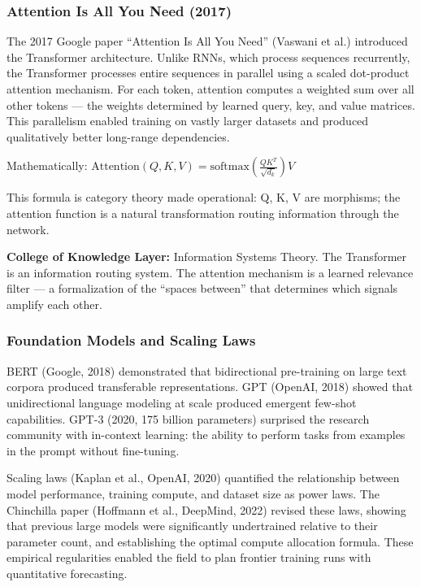 \documentclass[11pt,letterpaper]{article}
\begin{document}
\subsubsection{Attention Is All You Need (2017)}

The 2017 Google paper ``Attention Is All You Need'' (Vaswani et al.) introduced the Transformer architecture. Unlike RNNs, which process sequences recurrently, the Transformer processes entire sequences in parallel using a scaled dot-product attention mechanism. For each token, attention computes a weighted sum over all other tokens --- the weights determined by learned query, key, and value matrices. This parallelism enabled training on vastly larger datasets and produced qualitatively better long-range dependencies.

Mathematically: $\text{Attention}(Q,K,V) = \text{softmax}\left(\frac{QK^T}{\sqrt{d_k}}\right)V$

This formula is category theory made operational: Q, K, V are morphisms; the attention function is a natural transformation routing information through the network.

\textbf{College of Knowledge Layer:} Information Systems Theory. The Transformer is an information routing system. The attention mechanism is a learned relevance filter --- a formalization of the ``spaces between'' that determines which signals amplify each other.

\subsubsection{Foundation Models and Scaling Laws}

BERT (Google, 2018) demonstrated that bidirectional pre-training on large text corpora produced transferable representations. GPT (OpenAI, 2018) showed that unidirectional language modeling at scale produced emergent few-shot capabilities. GPT-3 (2020, 175 billion parameters) surprised the research community with in-context learning: the ability to perform tasks from examples in the prompt without fine-tuning.

Scaling laws (Kaplan et al., OpenAI, 2020) quantified the relationship between model performance, training compute, and dataset size as power laws. The Chinchilla paper (Hoffmann et al., DeepMind, 2022) revised these laws, showing that previous large models were significantly undertrained relative to their parameter count, and establishing the optimal compute allocation formula. These empirical regularities enabled the field to plan frontier training runs with quantitative forecasting.
\end{document}
